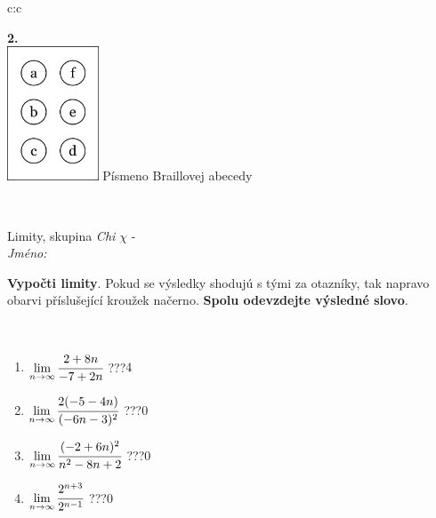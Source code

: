 \documentclass[10pt]{report}
\begin{document}
\begin{tabular}{c:c}
\begin{minipage}[c][104.5mm][t]{0.5\linewidth}
\begin{center}
\begin{minipage}{0.20\linewidth}
\begin{center}
{\Huge\bfseries 2.} \\[2mm]
\includegraphics[height=40mm]{../images/braille.png}
{\small Písmeno Braillovej abecedy}
\end{center}
\end{minipage}
\end{center}
\end{minipage}
\\ \hdashline
\begin{minipage}[c][104.5mm][t]{0.5\linewidth}
\begin{center}
\vspace{7mm}
{\huge Limity, skupina \textit{Chi $\chi$} -}\\[5mm]
\textit{Jméno:}\phantom{xxxxxxxxxxxxxxxxxxxxxxxxxxxxxxxxxxxxxxxxxxxxxxxxxxxxxxxxxxxxxxxxx}\\[5mm]
\begin{minipage}{0.95\linewidth}
\begin{center}
\textbf{Vypočti limity}. Pokud se výsledky shodujú s tými za otazníky, tak napravo\\obarvi příslušející kroužek načerno. \textbf{Spolu odevzdejte výsledné slovo}.
\end{center}
\end{minipage}
\\[1mm]
\begin{minipage}{0.79\linewidth}
\begin{center}
\begin{varwidth}{\linewidth}
\begin{enumerate}
\normalsize
\item $\lim\limits_{n\to\infty}\cfrac{2+8n}{-7+2n}$\quad \dotfill\; ???\;\dotfill \quad $4$
\item $\lim\limits_{n\to\infty}\cfrac{2(-5-4n)}{(-6n-3)^2}$\quad \dotfill\; ???\;\dotfill \quad $0$
\item $\lim\limits_{n\to\infty}\cfrac{(-2+6n)^2}{n^2-8n+2}$\quad \dotfill\; ???\;\dotfill \quad $0$
\item $\lim\limits_{n\to\infty}\cfrac{2^{n+3}}{2^{n-1}}$\quad \dotfill\; ???\;\dotfill \quad $0$

\end{enumerate}
\end{varwidth}
\end{center}
\end{minipage}
\end{center}
\end{minipage}
\end{tabular}
\end{document}
